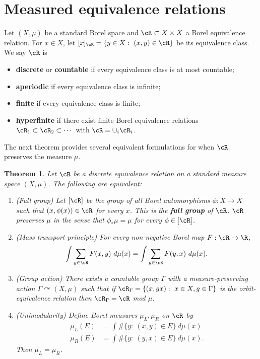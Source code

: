 \documentclass[12pt]{article}
\theoremstyle{plain}
\newtheorem{thm}{Theorem}[section]
\theoremstyle{definition}
\theoremstyle{remark}
\newcommand{\G}{\Gamma}
\def\cc{{\curvearrowright}}
\begin{document}
\section{Measured equivalence relations}\label{S:mer}


Let $(X,\mu)$ be a standard Borel  space and $\cR \subset X \times X$ a Borel equivalence relation. For $x\in X$, let $ [x]_\cR=\{y\in X:~(x,y) \in \cR\}$ be its equivalence class.  We say $\cR$ is 
\begin{itemize}
    \item {\bf discrete} or {\bf countable} if every equivalence class is at most countable;
    \item {\bf aperiodic} if every equivalence class is infinite;
    \item {\bf finite} if every equivalence class is finite;
    \item {\bf hyperfinite} if there exist finite Borel equivalence relations $\cR_1 \subset \cR_2\subset \cdots$ with $\cR=\cup_i \cR_i$.
\end{itemize}


The next theorem provides several equivalent formulations for when $\cR$ preserves the measure $\mu$.
\begin{thm}\label{T:mp}
    Let $\cR$ be a discrete equivalence relation on a standard measure space $(X,\mu)$. The following are equivalent:
    \begin{enumerate}
        \item (Full group) Let $[\cR]$ be the group of all Borel automorphisms $\phi:X \to X$ such that $(x,\phi(x))\in \cR $ for every $x$. This is the {\bf full group} of $\cR$. $\cR$ preserves $\mu$ in the sense that $\phi_*\mu=\mu$ for every $\phi \in [\cR]$.
        \item (Mass transport principle) For every non-negative Borel map $F:\cR \to \R$, 
$$\int \sum_{y\in \cR} F(x,y)~d\mu(x) = \int \sum_{y\in \cR} F(y,x)~d\mu(x).$$
\item (Group action) There exists a countable group $\G$ with a measure-preserving action $\G \cc (X,\mu)$ such that if $\cR_\G=\{(x,gx):~x\in X, g\in \G\}$ is the orbit-equivalence relation then $\cR_\G=\cR$ mod $\mu$.
\item (Unimodularity) Define Borel measures $\mu_L, \mu_R$ on $\cR$ by 
\begin{align*}
    \mu_L(E) &=  \int \#\{y:~(x,y) \in E\} ~d\mu(x)\\
   \mu_R(E) &=  \int \#\{y:~(y,x) \in E\} ~d\mu(x).
\end{align*}
Then $\mu_L=\mu_R$.
    \end{enumerate}
\end{thm}
\end{document}
